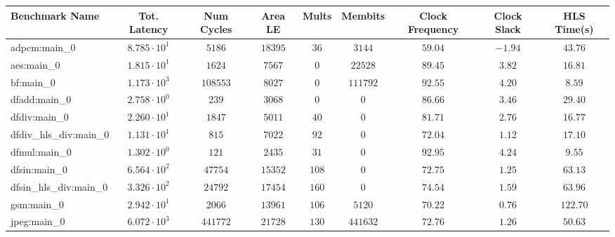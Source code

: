 \begin{tabular}{|l|c|c|c|c|c|c|c|c|}
\hline
Benchmark Name          & Tot. Latency           & Num Cycles & Area LE    & Mults   & Membits    & Clock Frequency & Clock Slack & HLS Time(s) \\
\hline
adpcm:main\_0           & $ 8.785 \cdot 10^{1} $ & $ 5186   $ & $ 18395  $ & $ 36  $ & $ 3144   $ & $ 59.04       $ & $ -1.94   $ & $ 43.76   $ \\
aes:main\_0             & $ 1.815 \cdot 10^{1} $ & $ 1624   $ & $ 7567   $ & $ 0   $ & $ 22528  $ & $ 89.45       $ & $ 3.82    $ & $ 16.81   $ \\
bf:main\_0              & $ 1.173 \cdot 10^{3} $ & $ 108553 $ & $ 8027   $ & $ 0   $ & $ 111792 $ & $ 92.55       $ & $ 4.20    $ & $ 8.59    $ \\
dfadd:main\_0           & $ 2.758 \cdot 10^{0} $ & $ 239    $ & $ 3068   $ & $ 0   $ & $ 0      $ & $ 86.66       $ & $ 3.46    $ & $ 29.40   $ \\
dfdiv:main\_0           & $ 2.260 \cdot 10^{1} $ & $ 1847   $ & $ 5011   $ & $ 40  $ & $ 0      $ & $ 81.71       $ & $ 2.76    $ & $ 16.77   $ \\
dfdiv\_hls\_div:main\_0 & $ 1.131 \cdot 10^{1} $ & $ 815    $ & $ 7022   $ & $ 92  $ & $ 0      $ & $ 72.04       $ & $ 1.12    $ & $ 17.10   $ \\
dfmul:main\_0           & $ 1.302 \cdot 10^{0} $ & $ 121    $ & $ 2435   $ & $ 31  $ & $ 0      $ & $ 92.95       $ & $ 4.24    $ & $ 9.55    $ \\
dfsin:main\_0           & $ 6.564 \cdot 10^{2} $ & $ 47754  $ & $ 15352  $ & $ 108 $ & $ 0      $ & $ 72.75       $ & $ 1.25    $ & $ 63.13   $ \\
dfsin\_hls\_div:main\_0 & $ 3.326 \cdot 10^{2} $ & $ 24792  $ & $ 17454  $ & $ 160 $ & $ 0      $ & $ 74.54       $ & $ 1.59    $ & $ 63.96   $ \\
gsm:main\_0             & $ 2.942 \cdot 10^{1} $ & $ 2066   $ & $ 13961  $ & $ 106 $ & $ 5120   $ & $ 70.22       $ & $ 0.76    $ & $ 122.70  $ \\
jpeg:main\_0            & $ 6.072 \cdot 10^{3} $ & $ 441772 $ & $ 21728  $ & $ 130 $ & $ 441632 $ & $ 72.76       $ & $ 1.26    $ & $ 50.63   $ \\

\end{tabular}
